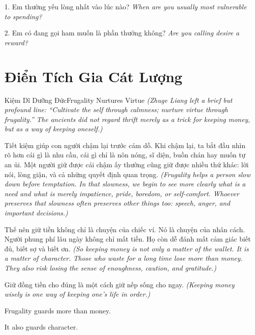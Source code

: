 \begin{tuhocnhanh}
1. Em thường yếu lòng nhất vào lúc nào? \textit{When are you usually most vulnerable to spending?}

2. Em có đang gọi ham muốn là phần thưởng không? \textit{Are you calling desire a reward?}
\end{tuhocnhanh}
\ngancach

\section{Điển Tích Gia Cát Lượng}
\begin{truyen}{Kiệm Dĩ Dưỡng Đức}{Frugality Nurtures Virtue}
\textit{(Zhuge Liang left a brief but profound line: ``Cultivate the self through calmness; nurture virtue through frugality.'' The ancients did not regard thrift merely as a trick for keeping money, but as a way of keeping oneself.)}

Tiết kiệm giúp con người chậm lại trước cám dỗ. Khi chậm lại, ta bắt đầu nhìn rõ hơn cái gì là nhu cầu, cái gì chỉ là nôn nóng, sĩ diện, buồn chán hay muốn tự an ủi. Một người giữ được cái chậm ấy thường cũng giữ được nhiều thứ khác: lời nói, lòng giận, và cả những quyết định quan trọng.
\textit{(Frugality helps a person slow down before temptation. In that slowness, we begin to see more clearly what is a need and what is merely impatience, pride, boredom, or self-comfort. Whoever preserves that slowness often preserves other things too: speech, anger, and important decisions.)}

Thế nên giữ tiền không chỉ là chuyện của chiếc ví. Nó là chuyện của nhân cách. Người phung phí lâu ngày không chỉ mất tiền. Họ còn dễ đánh mất cảm giác biết đủ, biết sợ và biết ơn.
\textit{(So keeping money is not only a matter of the wallet. It is a matter of character. Those who waste for a long time lose more than money. They also risk losing the sense of enoughness, caution, and gratitude.)}
\end{truyen}

\begin{baihoc}
Giữ đồng tiền cho đúng là một cách giữ nếp sống cho ngay.
\textit{(Keeping money wisely is one way of keeping one’s life in order.)}
\end{baihoc}

\begin{ghinhoanh}
Frugality guards more than money.

It also guards character.
\end{ghinhoanh}

